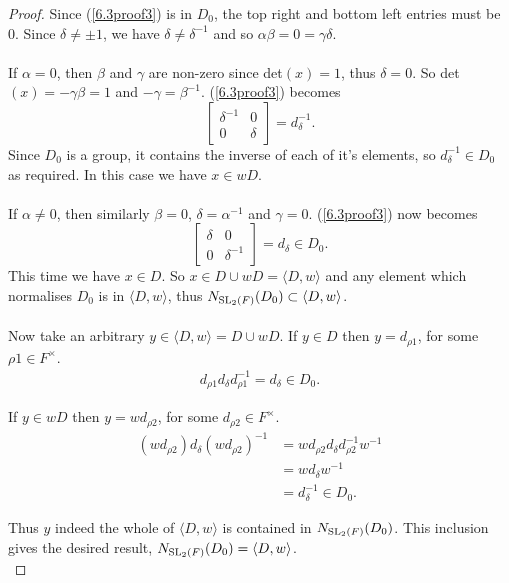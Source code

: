 \begin{proof}
    Since (\ref{6.3proof3}) is in $D_0$, the top right and bottom left entries must be 0. Since  $\delta \neq \pm 1$, we have $\delta \neq \delta^{-1}$ and so $\alpha \beta = 0 = \gamma \delta$. \\
    \\
     \space If $\alpha = 0$, then $\beta$ and $\gamma$ are non-zero since det$(x) = 1$, thus $\delta = 0$. So det$(x) = - \gamma \beta = 1$  and $- \gamma = \beta^{-1}$. (\ref{6.3proof3}) becomes $$\begin{bmatrix} \delta^{-1} & 0 \\ 0 & \delta \end{bmatrix} = d^{-1}_\delta.$$Since $D_0$ is a group, it contains the inverse of each of it's elements, so $d^{-1}_\delta \in D_0$ as required. In this case we have $x \in wD$. \\
    \\
     \space If $\alpha \neq 0$, then similarly $\beta = 0$, $\delta = \alpha^{-1}$ and $\gamma = 0$. (\ref{6.3proof3}) now becomes $$\begin{bmatrix} \delta & 0 \\ 0 & \delta^{-1} \end{bmatrix} = d_\delta \in D_0.$$This time we have $x \in D$. So $x \in D \cup wD = \langle D , w \rangle$ and any element which normalises $D_0$ is in $\langle D , w \rangle$, thus $N_{\operatorname{SL}_2(F)}(D_0) \subset \langle D , w \rangle$. \\
    \\
    Now take an arbitrary $y \in \langle D , w \rangle = D \cup wD$. If $y \in D$ then $y = d_{\rho 1}$, for some $\rho 1 \in F^\times$.
    \begin{align*} d_{\rho 1} d_\delta d^{-1}_{\rho 1} = d_\delta \in D_0.
    \end{align*}
    
    If $y \in wD$ then $y = w d_{\rho 2}$, for some $ d_{\rho 2} \in F^\times$.
    \begin{align*} (w d_{\rho 2}) d_\delta (w d_{\rho 2})^{-1} &= w d_{\rho 2} d_\delta d^{-1}_{\rho 2} w^{-1}
    \\ &= w d_\delta w^{-1}
    \\ &= d^{-1}_\delta \in D_0.
    \end{align*}
    
    Thus $y$ indeed the whole of $\langle D , w \rangle$ is contained in $N_{\operatorname{SL}_2(F)}(D_0)$. This inclusion gives the desired result, $N_{\operatorname{SL}_2(F)}(D_0) = \langle D , w \rangle$. \\
    
\end{proof}
